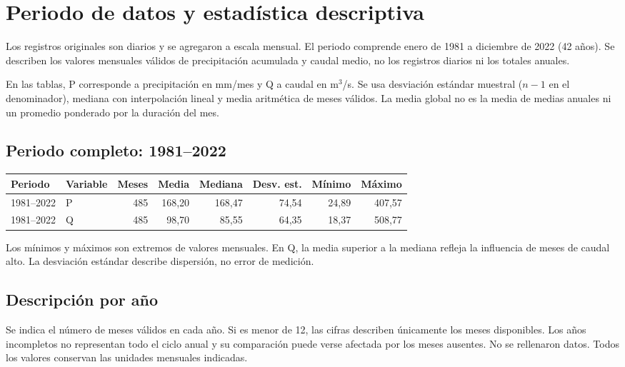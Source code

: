\section{Periodo de datos y estadística descriptiva}
Los registros originales son diarios y se agregaron a escala mensual. El periodo
comprende enero de 1981 a diciembre de 2022 (42 años). Se describen los valores
mensuales válidos de precipitación acumulada y caudal medio, no los registros
diarios ni los totales anuales.

En las tablas, P corresponde a precipitación en mm/mes y Q a caudal en m$^3$/s.
Se usa desviación estándar muestral ($n-1$ en el denominador), mediana con
interpolación lineal y media aritmética de meses válidos. La media global no es
la media de medias anuales ni un promedio ponderado por la duración del mes.

\subsection{Periodo completo: 1981--2022}
\begin{center}\small
\begin{tabular}{llrrrrrr}\hline
Periodo & Variable & Meses & Media & Mediana & Desv. est. & Mínimo & Máximo \\
\hline
1981--2022 & P & 485 & 168,20 & 168,47 & 74,54 & 24,89 & 407,57 \\
1981--2022 & Q & 485 & 98,70 & 85,55 & 64,35 & 18,37 & 508,77 \\
\hline\end{tabular}\end{center}
Los mínimos y máximos son extremos de valores mensuales. En Q, la media superior
a la mediana refleja la influencia de meses de caudal alto. La desviación estándar
describe dispersión, no error de medición.

\subsection{Descripción por año}
Se indica el número de meses válidos en cada año. Si es menor de 12, las cifras
describen únicamente los meses disponibles. Los años incompletos no representan
todo el ciclo anual y su comparación puede verse afectada por los meses ausentes.
No se rellenaron datos. Todos los valores conservan las unidades mensuales indicadas.


